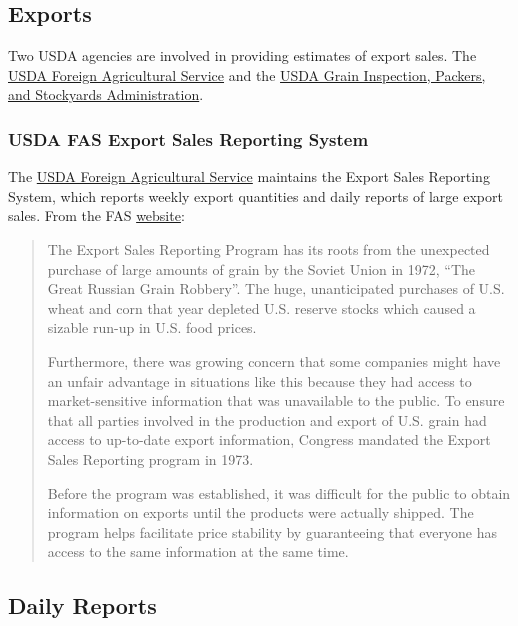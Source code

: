 \documentclass[
  letterpaper,
  DIV=11,
  numbers=noendperiod]{scrreprt}
\begin{document}
\subsection{Exports}\label{exports-1}

Two USDA agencies are involved in providing estimates of export sales.
The \href{http://www.fas.usda.gov/}{USDA Foreign Agricultural Service}
and the \href{http://www.gipsa.usda.gov/}{USDA Grain Inspection,
Packers, and Stockyards Administration}.

\subsubsection{USDA FAS Export Sales Reporting
System}\label{usda-fas-export-sales-reporting-system}

The \href{http://www.fas.usda.gov/}{USDA Foreign Agricultural Service}
maintains the Export Sales Reporting System, which reports weekly export
quantities and daily reports of large export sales. From the FAS
\href{https://apps.fas.usda.gov/export-sales/FACT\%20SHEET.pdf}{website}:

\begin{quote}
The Export Sales Reporting Program has its roots from the unexpected
purchase of large amounts of grain by the Soviet Union in 1972, ``The
Great Russian Grain Robbery''. The huge, unanticipated purchases of U.S.
wheat and corn that year depleted U.S. reserve stocks which caused a
sizable run-up in U.S. food prices.

Furthermore, there was growing concern that some companies might have an
unfair advantage in situations like this because they had access to
market-sensitive information that was unavailable to the public. To
ensure that all parties involved in the production and export of U.S.
grain had access to up-to-date export information, Congress mandated the
Export Sales Reporting program in 1973.

Before the program was established, it was difficult for the public to
obtain information on exports until the products were actually shipped.
The program helps facilitate price stability by guaranteeing that
everyone has access to the same information at the same time.
\end{quote}

\subsection{Daily Reports}\label{daily-reports}
\end{document}
